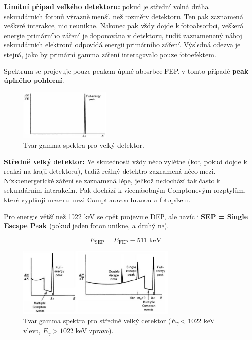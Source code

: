 \textbf{Limitní případ velkého detektoru:} pokud je střední volná dráha sekundárních fotonů výrazně menší, než rozměry detektoru. Ten pak zaznamená veškeré interakce, nic neunikne. Nakonec pak vždy dojde k fotoabsorbci, veškerá energie primárního záření je doponována v detektoru, tudíž zaznamenaný náboj sekundárních elektronů odpovídá energii primárního záření. Výsledná odezva je stejná, jako by primární gamma záření interagovalo pouze fotoefektem.

Spektrum se projevuje pouze peakem úplné abosrbce FEP, v tomto případě \textbf{peak úplného pohlcení}.

\begin{figure}[H]
    \centering
    \includegraphics[width=0.4\textwidth]{img/velky_detektor.JPG}
    \caption{Tvar gamma spektra pro velký detektor.}
\end{figure}

\textbf{Středně velký detektor:} Ve skutečnosti vždy něco vylétne (kor, pokud dojde k reakci na kraji detektoru), tudíž reálný detektro zaznamená něco mezi. Nízkoenergetické záření se zaznamená lépe, jelikož nedochází tak často k sekundárním interakcím. Pak dochází k vícenásobným Comptonovým rozptylům, které vyplňují mezeru mezi Comptonovou hranou a fotopíkem.

Pro energie větší než 1022 keV se opět projevuje DEP, ale navíc i \textbf{SEP = Single Escape Peak} (pokud jeden foton unikne, a druhý ne).

$$ E_\text{SEP} = E_\text{FEP} - 511 \text{ keV}. $$

\begin{figure}[H]
    \centering
    \includegraphics[width=0.7\textwidth]{img/stredni_detektor.JPG}
    \caption{Tvar gamma spektra pro středně velký detektor ($E_\gamma < 1022$ keV vlevo, $E_\gamma > 1022$ keV vpravo).}
\end{figure}

